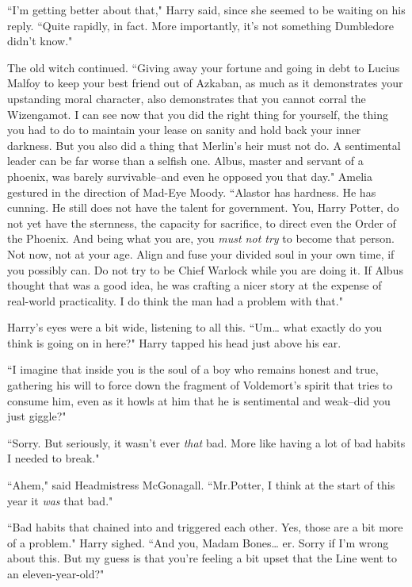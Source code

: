 ``I'm getting better about that," Harry said, since she seemed to be waiting on his reply. ``Quite rapidly, in fact. More importantly, it's not something Dumbledore didn't know."

The old witch continued. ``Giving away your fortune and going in debt to Lucius Malfoy to keep your best friend out of Azkaban, as much as it demonstrates your upstanding moral character, also demonstrates that you cannot corral the Wizengamot. I can see now that you did the right thing for yourself, the thing you had to do to maintain your lease on sanity and hold back your inner darkness. But you also did a thing that Merlin's heir must not do. A sentimental leader can be far worse than a selfish one. Albus, master and servant of a phoenix, was barely survivable\---and even he opposed you that day." Amelia gestured in the direction of Mad-Eye Moody. ``Alastor has hardness. He has cunning. He still does not have the talent for government. You, Harry Potter, do not yet have the sternness, the capacity for sacrifice, to direct even the Order of the Phoenix. And being what you are, you \emph{must not try} to become that person. Not now, not at your age. Align and fuse your divided soul in your own time, if you possibly can. Do not try to be Chief Warlock while you are doing it. If Albus thought that was a good idea, he was crafting a nicer story at the expense of real-world practicality. I do think the man had a problem with that."

Harry's eyes were a bit wide, listening to all this. ``Um{\ldots} what exactly do you think is going on in here?" Harry tapped his head just above his ear.

``I imagine that inside you is the soul of a boy who remains honest and true, gathering his will to force down the fragment of Voldemort's spirit that tries to consume him, even as it howls at him that he is sentimental and weak\---did you just giggle?"

``Sorry. But seriously, it wasn't ever \emph{that} bad. More like having a lot of bad habits I needed to break."

``Ahem," said Headmistress McGonagall. ``Mr.\?Potter, I think at the start of this year it \emph{was} that bad."

``Bad habits that chained into and triggered each other. Yes, those are a bit more of a problem." Harry sighed. ``And you, Madam Bones{\ldots} er. Sorry if I'm wrong about this. But my guess is that you're feeling a bit upset that the Line went to an eleven-year-old?"

